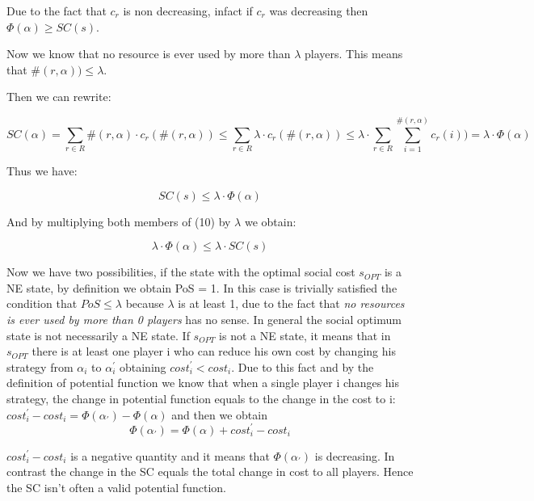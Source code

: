 \documentclass[11pt]{article}
\theoremstyle{definition}
\begin{document}
Due to the fact that $c_{r}$ is non decreasing, infact if $c_{r}$ was decreasing then $\Phi(\alpha) \ge SC(s)$.

Now we know that no resource is ever used by more than $\lambda$ players. This means that $ \#(r,\alpha)) \le \lambda$.

Then we can rewrite: 

\begin{equation} SC(\alpha) = \sum_{r \in R} \#(r,\alpha) \cdot { c_{r} (\#(r,\alpha))} \le   \sum_{r \in R} \lambda \cdot { c_{r} (\#(r,\alpha))} \le  \lambda \cdot  \sum_{r \in R}\sum_{i=1}^{\#(r,\alpha)}{ c_{r} (i))} = \lambda \cdot \Phi (\alpha) \end{equation}

Thus we have: 

\begin{equation}
SC(s) \le \lambda \cdot \Phi(\alpha) 
\end{equation}

And by multiplying both members of (10) by $\lambda$ we obtain: 

\begin{equation}
\lambda \cdot \Phi(\alpha)  \le  \lambda \cdot SC(s)
\end{equation}

Now we have two possibilities, if the state with the optimal social cost $s_{OPT}$ is a NE state, by definition we obtain PoS = 1. In this case is trivially satisfied the condition that $PoS \le \lambda$ because $\lambda$ is at least 1, due to the fact that \textit{no resources is ever used by more than 0 players} has no sense. In general the social optimum state is not necessarily a NE state. If $s_{OPT}$ is not a NE state, it means that in $s_{OPT}$ there is at least one player i who can reduce his own cost by changing his strategy from $\alpha_{i}$ to $\alpha_{i}^{'}$ obtaining $cost^{'}_{i} < cost_{i}$.
Due to this fact and by the definition of potential function we know that when a single player i changes his strategy, the change in potential function equals to the change in the cost to i:  $cost^{'}_{i} - cost_{i} = \Phi(\alpha_{'}) - \Phi(\alpha)$
and then we obtain \begin{equation}  \Phi(\alpha_{'}) = \Phi(\alpha) + cost^{'}_{i} - cost_{i} \end{equation}

$cost^{'}_{i} - cost_{i}$ is a negative quantity and it means that $ \Phi(\alpha_{'})$ is decreasing. In contrast the change in the SC equals the total change in cost to all players. Hence the SC isn't often a valid potential function.
\end{document}
